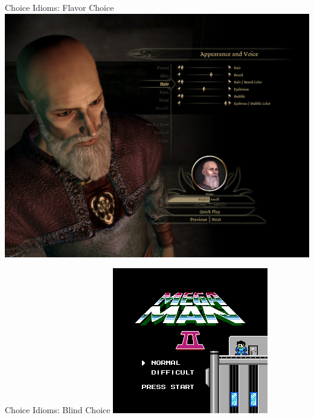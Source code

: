 \documentclass[xcolor=x11names]{beamer}
\begin{document}
\begin{frame}{Choice Idioms: Flavor Choice}
  \includegraphics[width=\textwidth]{res/da-customization.jpg}
\end{frame}

\begin{frame}{Choice Idioms: Blind Choice}
  \includegraphics[width=\textwidth]{res/megaman2-difficulty.png}
\end{frame}
\end{document}

